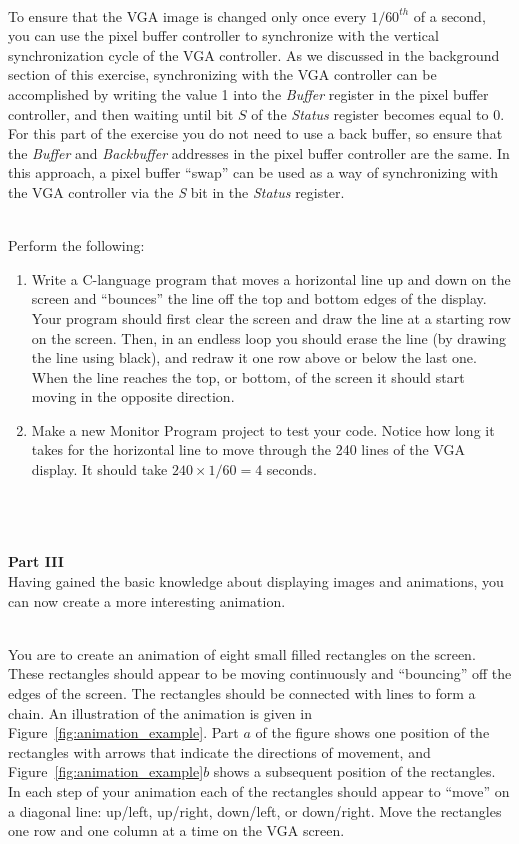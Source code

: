 \documentclass[epsfig,10pt,fullpage]{article}
\begin{document}
~\\
\noindent
To ensure that the VGA image is changed only once every $1/60^{th}$ of a second, you can use the 
pixel buffer controller to synchronize with the vertical synchronization cycle of the VGA 
controller. As we discussed in the background section of this exercise, synchronizing with the 
VGA controller can be accomplished by writing the value 1 into the {\it Buffer} register in the 
pixel buffer controller, and then waiting until bit $S$ of the {\it Status} register becomes 
equal to 0. For this part of the exercise you do not need to use a back buffer, so ensure
that the {\it Buffer} and {\it Backbuffer} addresses in the pixel buffer controller are the 
same. In this approach, a pixel buffer ``swap'' can be used as a way of synchronizing with 
the VGA controller via the {\it S} bit in the {\it Status} register.

~\\
\noindent
Perform the following:

\begin{enumerate}

\item Write a C-language program that moves a horizontal line up and down on the screen and 
``bounces'' the line off the top and bottom edges of the display. Your program should first 
clear the screen and draw the line at a starting row on the screen. Then, in an endless
loop you should erase the line (by drawing the line using black), and redraw it one row
above or below the last one.  When the line reaches the top, or bottom, of the screen 
it should start moving in the opposite direction.

\item Make a new Monitor Program project to test your code. Notice how long it takes for the 
horizontal line to move through the 240 lines of the VGA display. It should take 
$240 \times 1/60 = 4$ seconds.
\end{enumerate}

~\\
~\\
~\\
\noindent
{\bf Part III}
~\\

\noindent
Having gained the basic knowledge about displaying images and animations, you can now create 
a more interesting animation.

~\\
\noindent
You are to create an animation of eight small filled rectangles on the screen. These rectangles 
should appear to be moving continuously and ``bouncing'' off the edges of the screen. The 
rectangles should be connected with lines to form a chain. An illustration of the animation 
is given in Figure~\ref{fig:animation_example}. Part $a$ of the figure shows one position
of the rectangles with arrows that indicate the directions of movement, and 
Figure~\ref{fig:animation_example}$b$ shows a subsequent position of the rectangles. 
In each step of your animation each of the rectangles should appear to ``move'' on a diagonal 
line: up/left, up/right, down/left, or down/right. Move the rectangles one
row and one column at a time on the VGA screen.
\end{document}
